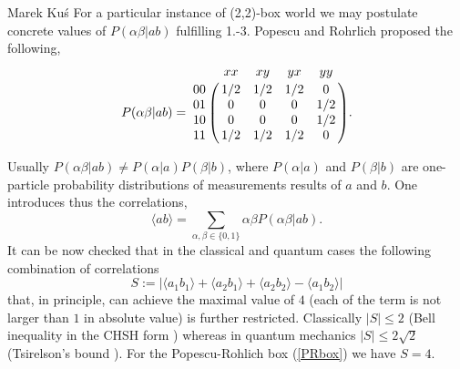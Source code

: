 \begin{artengenv}{Marek Ku\'s}
For a particular instance of (2,2)-box world we may postulate concrete values of $P(\alpha\beta| ab)$ fulfilling 1.-3. Popescu and Rohrlich \parencite*{popescu_quantum_1994}  proposed the following,
\begin{equation}\label{PRbox}
P(\alpha\beta|ab) = \bordermatrix{
	\mathrm{} &  xx &  xy &  yx &  yy \cr
	00 & 1/2 & 1/2 & 1/2 &   0 \cr
	01 &   0 &   0 &   0 & 1/2\cr
	10 &   0 & 0   & 0   & 1/2\cr
	11 & 1/2 & 1/2 & 1/2 &   0
}.
\end{equation}    

Usually $P(\alpha\beta| ab)\ne P(\alpha|a)P(\beta|b)$, where $P(\alpha|a)$ and $P(\beta|b)$ are one-particle probability distributions of measurements results of $a$ and $b$. One introduces thus the correlations,
\begin{equation}\label{corr}
\langle ab \rangle = \sum_{\alpha,\beta\in\{0,1\}}\alpha\beta P(\alpha\beta|ab).
\end{equation}
It can be now checked that in the classical and quantum cases the following combination of correlations
\begin{equation}\label{S}
S:=|\langle a_1 b_1 \rangle + \langle a_2 b_1 \rangle + \langle a_2 b_2\rangle - \langle a_1 b_2 \rangle|
\end{equation}
that, in principle, can achieve the maximal value of $4$ (each of the term is not larger than $1$ in absolute value) is further restricted. Classically $|S|\le 2$ (Bell \parencite*{bell_einstein-podolsky-rosen_1964} inequality in the CHSH form \parencite{clauser_proposed_1969}) whereas in quantum mechanics $|S|\le 2\sqrt{2}$ (Tsirelson's bound \parencite{cirelson_quantum_1980}).  
For the Popescu-Rohlich box (\ref{PRbox}) we have $S=4$.


\end{artengenv}
